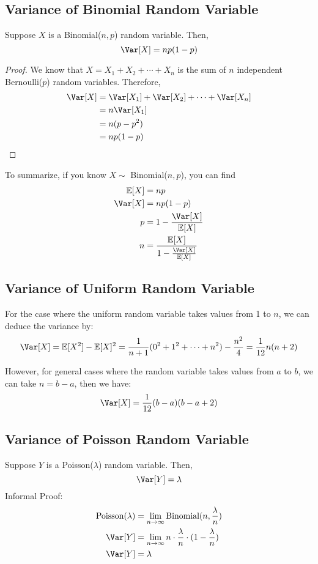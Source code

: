 \subsection{Variance of Binomial Random Variable}
Suppose \(X\) is a Binomial(\(n, p\)) random variable. Then,
\[
    \Var[X] = np(1 - p)
\]
\begin{proof}
    We know that \(X = X_1 + X_2 + \cdots + X_n\) is the sum of \(n\) independent Bernoulli(\(p\)) random variables. Therefore, 
    \[
    \begin{aligned}
        \Var[X] &= \Var[X_1] + \Var[X_2] + \cdots + \Var[X_n] \\
        &= n\Var[X_1] \\
        &= n(p - p^2) \\
        &= np(1 - p)
    \end{aligned}
    \]
\end{proof}

To summarize, if you know \(X \sim\) Binomial(\(n, p\)), you can find
\[
    \begin{aligned}
        \mathbb{E}[X] &= np \\
        \Var[X] &= np(1 - p) \\
        p &= 1- \dfrac{\Var[X]}{\mathbb{E}[X]} \\
        n &= \dfrac{\mathbb{E}[X]}{1- \frac{\Var[X]}{\mathbb{E}[X]}}
    \end{aligned}
\]

\subsection{Variance of Uniform Random Variable}
For the case where the uniform random variable takes values from 1 to \(n\), we can deduce the variance by:
\[
    \Var[X] = \mathbb{E}[X^2] - \mathbb{E}[X]^2 = \dfrac{1}{n + 1}(0^2 + 1^2 + \cdots + n^2) - \dfrac{n^2}{4} = \dfrac{1}{12}n(n + 2)
\]

However, for general cases where the random variable takes values from \(a\) to \(b\), we can take \(n = b - a\), then we have:
\[
    \Var[X] = \dfrac{1}{12}(b-a)(b - a + 2)
\]

\subsection{Variance of Poisson Random Variable}
Suppose \(Y\) is a Poisson(\(\lambda\)) random variable. Then,
\[
    \Var[Y] = \lambda 
\]
Informal Proof: 
\[
    \begin{aligned}
        \text{Poisson}(\lambda) &= \lim_{n \to \infty} \text{Binomial}(n, \dfrac{\lambda}{n}) \\
        \Var[Y] &= \lim_{n \to \infty} n \cdot \dfrac{\lambda}{n} \cdot (1 - \dfrac{\lambda}{n}) \\
        \Var[Y] &= \lambda
    \end{aligned}
\]

